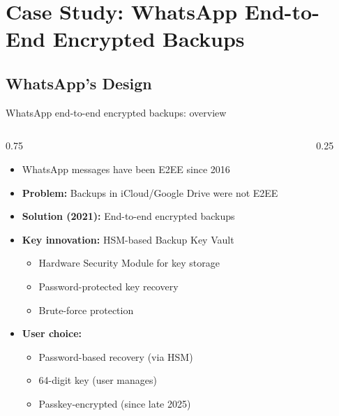 \ifdefined\PRESENTATION\else\PassOptionsToClass{handout}{beamer}\fi\documentclass[aspectratio=169, lualatex]{beamer}
\begin{document}
\section{Case Study: WhatsApp End-to-End Encrypted Backups}

\subsection{WhatsApp's Design}

\begin{frame}{WhatsApp end-to-end encrypted backups: overview}
	\begin{columns}[c]
		\begin{column}{0.75\textwidth}
			\begin{itemize}
				\item WhatsApp messages have been E2EE since 2016
				\item \textbf{Problem:} Backups in iCloud/Google Drive were not E2EE
				\item \textbf{Solution (2021):} End-to-end encrypted backups
				\item \textbf{Key innovation:} HSM-based Backup Key Vault
				      \begin{itemize}
					      \item Hardware Security Module for key storage
					      \item Password-protected key recovery
					      \item Brute-force protection
				      \end{itemize}
				\item \textbf{User choice:}
				      \begin{itemize}
					      \item Password-based recovery (via HSM)
					      \item 64-digit key (user manages)
					      \item Passkey-encrypted (since late 2025)
				      \end{itemize}
			\end{itemize}
		\end{column}
		\begin{column}{0.25\textwidth}
		\end{column}
	\end{columns}
\end{frame}
\end{document}
